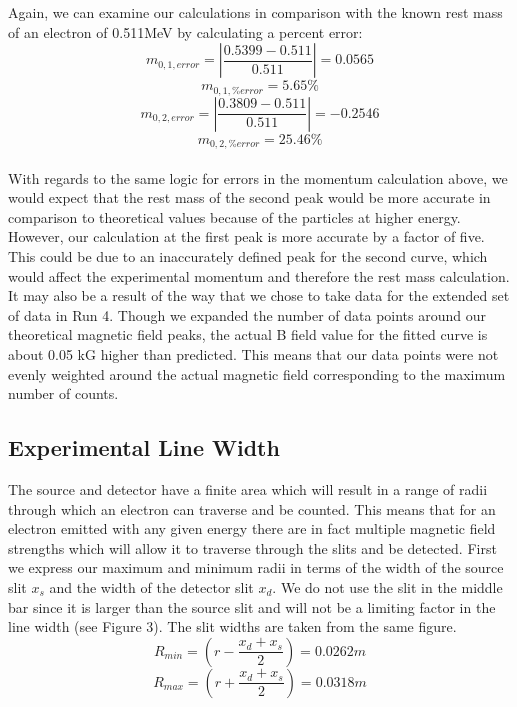 Again, we can examine our calculations in comparison with the known rest mass of an electron of 0.511MeV by calculating a percent error:
\begin{equation} m_{0,1,error}=|\frac{0.5399-0.511}{0.511}|=0.0565\end{equation}
\begin{equation} m_{0,1,\%error}=5.65\%\end{equation}
\begin{equation} m_{0,2,error}=|\frac{0.3809-0.511}{0.511}|=-0.2546\end{equation}
\begin{equation} m_{0,2,\%error}=25.46\%\end{equation}\\
With regards to the same logic for errors in the momentum calculation above, we would expect that the rest mass of the second peak would be more accurate in comparison to theoretical values because of the particles at higher energy. However, our calculation at the first peak is more accurate by a factor of five. This could be due to an inaccurately defined peak for the second curve, which would affect the experimental momentum and therefore the rest mass calculation. It may also be a result of the way that we chose to take data for the extended set of data in Run 4. Though we expanded the number of data points around our theoretical magnetic field peaks, the actual B field value for the fitted curve is about 0.05 kG higher than predicted. This means that our data points were not evenly weighted around the actual magnetic field corresponding to the maximum number of counts. 

\subsection{Experimental Line Width}
The source and detector have a finite area which will result in a range of radii through which an electron can traverse and be counted. This means that for an electron emitted with any given energy there are in fact multiple magnetic field strengths which will allow it to traverse through the slits and be detected. First we express our maximum and minimum radii in terms of the width of the source slit $x_s$ and the width of the detector slit $x_d$.  We do not use the slit in the middle bar since it is larger than the source slit and will not be a limiting factor in the line width (see Figure 3). The slit widths are taken from the same figure. 
\begin{equation}
R_{min} = (r-\frac{x_d + x_s}{2}) = 0.0262 m 
\end{equation}  
\begin{equation}
R_{max} = (r+\frac{x_d + x_s}{2}) = 0.0318 m 
\end{equation}  

